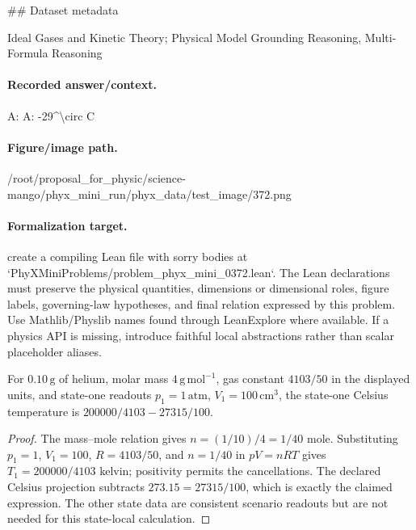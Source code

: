 \#\# Dataset metadata

Ideal Gases and Kinetic Theory; Physical Model Grounding Reasoning, Multi-Formula Reasoning

\paragraph{Recorded answer/context.}
A: A: -29\textasciicircum{}\textbackslash{}circ C

\paragraph{Figure/image path.}
/root/proposal\_for\_physic/science-mango/phyx\_mini\_run/phyx\_data/test\_image/372.png

\paragraph{Formalization target.}
create a compiling Lean file with sorry bodies at `PhyXMiniProblems/problem\_phyx\_mini\_0372.lean`. The Lean declarations must preserve the physical quantities, dimensions or dimensional roles, figure labels, governing-law hypotheses, and final relation expressed by this problem.
Use Mathlib/Physlib names found through LeanExplore where available. If a physics API is missing, introduce faithful local abstractions rather than scalar placeholder aliases.

\begin{theorem}
\label{thm:physics:phyx_mini_0372:target}
For \(0.10\,\mathrm g\) of helium, molar mass
\(4\,\mathrm{g\,mol^{-1}}\), gas constant \(4103/50\) in the displayed
units, and state-one readouts \(p_1=1\,\mathrm{atm}\),
\(V_1=100\,\mathrm{cm^3}\), the state-one Celsius temperature is
\(200000/4103-27315/100\).
\end{theorem}
\begin{proof}
The mass--mole relation gives
\(n=(1/10)/4=1/40\) mole.  Substituting \(p_1=1\), \(V_1=100\),
\(R=4103/50\), and \(n=1/40\) in \(pV=nRT\) gives
\(T_1=200000/4103\) kelvin; positivity permits the cancellations.
The declared Celsius projection subtracts \(273.15=27315/100\), which is
exactly the claimed expression.  The other state data are consistent
scenario readouts but are not needed for this state-local calculation.
\end{proof}

